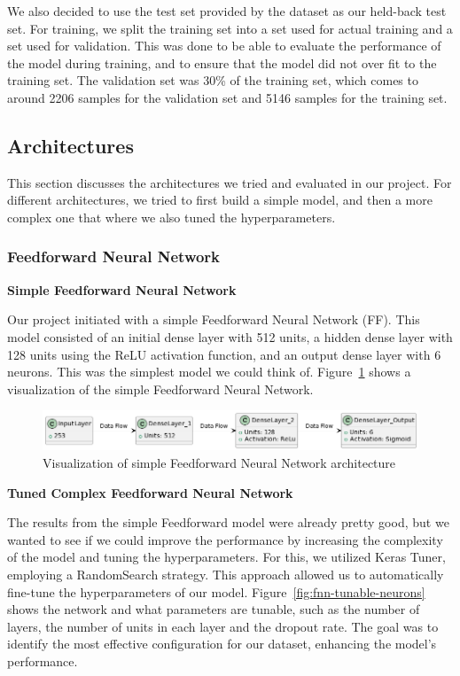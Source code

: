 We also decided to use the test set provided by the dataset as our held-back test set.
For training, we split the training set into a set used for actual training and a set used for validation.
This was done to be able to evaluate the performance of the model during training, and to ensure that the model did not over fit to the training set.
The validation set was 30\% of the training set, which comes to around 2206 samples for the validation set and 5146 samples for the training set.

\subsection{Architectures}\label{subsec:architectures}

This section discusses the architectures we tried and evaluated in our project.
For different architectures, we tried to first build a simple model, and then a more complex one that where we also tuned the hyperparameters.

\subsubsection{Feedforward Neural Network}

\textbf{Simple Feedforward Neural Network}

Our project initiated with a simple Feedforward Neural Network (FF).
This model consisted of an initial dense layer with 512 units, a hidden dense layer with 128 units using the ReLU activation function, and an output dense layer with 6 neurons.
This was the simplest model we could think of.
Figure~\ref{fig:fnn-simple-architecture} shows a visualization of the simple Feedforward Neural Network.

\begin{figure}[ht]
    \centering
    \includegraphics[width=\textwidth]{./img/ffnn/simple/fnn-simple-architecture}
    \caption{Visualization of simple Feedforward Neural Network architecture}
    \label{fig:fnn-simple-architecture}
\end{figure}

\textbf{Tuned Complex Feedforward Neural Network}

The results from the simple Feedforward model were already pretty good, but we wanted to see if we could improve the performance by increasing the complexity of the model and tuning the hyperparameters.
For this, we utilized Keras Tuner, employing a RandomSearch strategy.
This approach allowed us to automatically fine-tune the hyperparameters of our model.
Figure~\ref{fig:fnn-tunable-neurons} shows the network and what parameters are tunable, such as the number of layers, the number of units in each layer and the dropout rate.
The goal was to identify the most effective configuration for our dataset, enhancing the model's performance.

